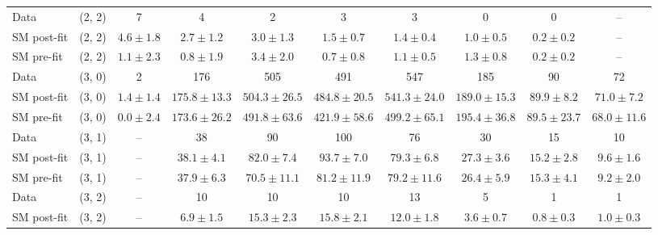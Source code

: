 {\begin{table}[h!]
{\begin{tabular}{lccccccccc}
    Data        & (2, 2)           & 7                   & 4                   & 2                  & 3                  & 3                  & 0                  & 0                 & --                \\[0.5ex] 
    SM post-fit & (2, 2)           & $4.6\pm{ 1.8 }$     & $2.7\pm{ 1.2 }$     & $3.0\pm{ 1.3 }$    & $1.5\pm{ 0.7 }$    & $1.4\pm{ 0.4 }$    & $1.0\pm{ 0.5 }$    & $0.2\pm{ 0.2 }$   & --                \\[0.5ex] 
    SM pre-fit  & (2, 2)           & $1.1\pm{ 2.3 }$     & $0.8\pm{ 1.9 }$     & $3.4\pm{ 2.0 }$    & $0.7\pm{ 0.8 }$    & $1.1\pm{ 0.5 }$    & $1.3\pm{ 0.8 }$    & $0.2\pm{ 0.2 }$   & --                \\[0.5ex] 
    Data        & (3, 0)           & 2                   & 176                 & 505                & 491                & 547                & 185                & 90                & 72                \\[0.5ex] 
    SM post-fit & (3, 0)           & $1.4\pm{ 1.4 }$     & $175.8\pm{ 13.3 }$  & $504.3\pm{ 26.5 }$ & $484.8\pm{ 20.5 }$ & $541.3\pm{ 24.0 }$ & $189.0\pm{ 15.3 }$ & $89.9\pm{ 8.2 }$  & $71.0\pm{ 7.2 }$  \\[0.5ex] 
    SM pre-fit  & (3, 0)           & $0.0\pm{ 2.4 }$     & $173.6\pm{ 26.2 }$  & $491.8\pm{ 63.6 }$ & $421.9\pm{ 58.6 }$ & $499.2\pm{ 65.1 }$ & $195.4\pm{ 36.8 }$ & $89.5\pm{ 23.7 }$ & $68.0\pm{ 11.6 }$ \\[0.5ex] 
    Data        & (3, 1)           & --                  & 38                  & 90                 & 100                & 76                 & 30                 & 15                & 10                \\[0.5ex] 
    SM post-fit & (3, 1)           & --                  & $38.1\pm{ 4.1 }$    & $82.0\pm{ 7.4 }$   & $93.7\pm{ 7.0 }$   & $79.3\pm{ 6.8 }$   & $27.3\pm{ 3.6 }$   & $15.2\pm{ 2.8 }$  & $9.6\pm{ 1.6 }$   \\[0.5ex] 
    SM pre-fit  & (3, 1)           & --                  & $37.9\pm{ 6.3 }$    & $70.5\pm{ 11.1 }$  & $81.2\pm{ 11.9 }$  & $79.2\pm{ 11.6 }$  & $26.4\pm{ 5.9 }$   & $15.3\pm{ 4.1 }$  & $9.2\pm{ 2.0 }$   \\[0.5ex] 
    Data        & (3, 2)           & --                  & 10                  & 10                 & 10                 & 13                 & 5                  & 1                 & 1                 \\[0.5ex] 
    SM post-fit & (3, 2)           & --                  & $6.9\pm{ 1.5 }$     & $15.3\pm{ 2.3 }$   & $15.8\pm{ 2.1 }$   & $12.0\pm{ 1.8 }$   & $3.6\pm{ 0.7 }$    & $0.8\pm{ 0.3 }$   & $1.0\pm{ 0.3 }$   \\[0.5ex] 

\end{tabular}}
\end{table}}
